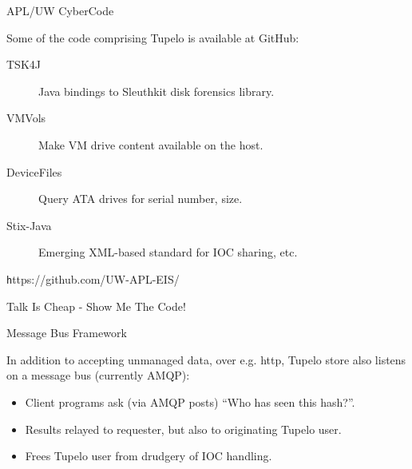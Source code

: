 \documentclass{beamer}
\begin{document}

\begin{frame}{APL/UW CyberCode}

Some of the code comprising Tupelo is available at GitHub:

\begin{description}
\item[TSK4J]
Java bindings to Sleuthkit disk forensics library.

\item[VMVols]
Make VM drive content available on the host.

\item[DeviceFiles]
Query ATA drives for serial number, size.

\item[Stix-Java]
Emerging XML-based standard for IOC sharing, etc.

\end{description}

\vskip 10pt

{\texttt https://github.com/UW-APL-EIS/}

\end{frame}

\begin{frame}{Talk Is Cheap - Show Me The Code!}
\end{frame}

\begin{frame}{Message Bus Framework}

In addition to accepting unmanaged data, over e.g. http, Tupelo store
also listens on a message bus (currently AMQP):

\begin{itemize}
\item
Client programs ask (via AMQP posts) ``Who has seen this hash?''.

\item
Results relayed to requester, but also to originating Tupelo user.

\item
Frees Tupelo user from drudgery of IOC handling.

\end{itemize}

\end{frame}
\end{document}
